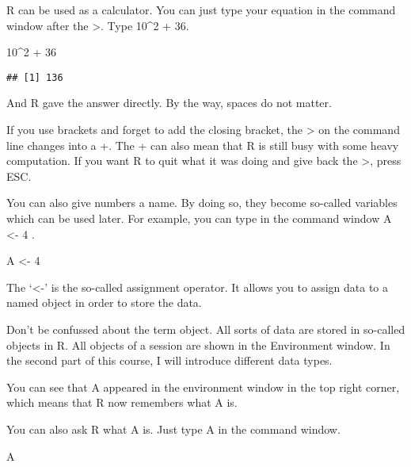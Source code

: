 \documentclass[
]{article}
\newenvironment{Shaded}{\begin{snugshade}}{\end{snugshade}}
\newcommand{\DecValTok}[1]{\textcolor[rgb]{0.00,0.00,0.81}{#1}}
\newcommand{\NormalTok}[1]{#1}
\newcommand{\OtherTok}[1]{\textcolor[rgb]{0.56,0.35,0.01}{#1}}
\newcommand{\SpecialCharTok}[1]{\textcolor[rgb]{0.00,0.00,0.00}{#1}}
\begin{document}
R can be used as a calculator. You can just type your equation in the
command window after the \textgreater. Type 10\^{}2 + 36.

\begin{Shaded}
\begin{Highlighting}[]
\DecValTok{10}\SpecialCharTok{\^{}}\DecValTok{2} \SpecialCharTok{+} \DecValTok{36}
\end{Highlighting}
\end{Shaded}

\begin{verbatim}
## [1] 136
\end{verbatim}

And R gave the answer directly. By the way, spaces do not matter.

If you use brackets and forget to add the closing bracket, the
\textgreater{} on the command line changes into a +. The + can also mean
that R is still busy with some heavy computation. If you want R to quit
what it was doing and give back the \textgreater, press ESC.

You can also give numbers a name. By doing so, they become so-called
variables which can be used later. For example, you can type in the
command window A \textless- 4 .

\begin{Shaded}
\begin{Highlighting}[]
\NormalTok{A }\OtherTok{\textless{}{-}} \DecValTok{4}
\end{Highlighting}
\end{Shaded}

The `\textless-' is the so-called assignment operator. It allows you to
assign data to a named object in order to store the data.

Don't be confussed about the term object. All sorts of data are stored
in so-called objects in R. All objects of a session are shown in the
Environment window. In the second part of this course, I will introduce
different data types.

You can see that A appeared in the environment window in the top right
corner, which means that R now remembers what A is.

You can also ask R what A is. Just type A in the command window.

\begin{Shaded}
\begin{Highlighting}[]
\NormalTok{A}
\end{Highlighting}
\end{Shaded}
\end{document}
